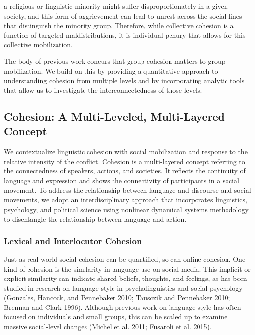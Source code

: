 \documentclass[
  english,
  man]{apa6}
\begin{document}
\begin{singlespace}
\setlength{\leftskip}{1cm}

\noindent a religious or linguistic minority
might suffer disproportionately in a given society, and this form of
aggrievement can lead to unrest across the social lines that distinguish the
minority group. Therefore, while collective cohesion is a function of targeted
maldistributions, it is individual penury that allows for this collective
mobilization.

\setlength{\leftskip}{0pt}
\end{singlespace}

The body of previous work concurs that group cohesion matters to group
mobilization. We build on this by providing a quantitative approach to
understanding cohesion from multiple levels and by incorporating analytic tools
that allow us to investigate the interconnectedness of those levels.

\hypertarget{cohesion-a-multi-leveled-multi-layered-concept}{%
\subsection{Cohesion: A Multi-Leveled, Multi-Layered Concept}\label{cohesion-a-multi-leveled-multi-layered-concept}}

We contextualize linguistic cohesion with social mobilization and response to
the relative intensity of the conflict. Cohesion is a multi-layered concept
referring to the connectedness of speakers, actions, and societies. It
reflects the continuity of language and expression and shows the
connectivity of participants in a social movement. To address the relationship
between language and discourse and social movements, we adopt an
interdisciplinary approach that incorporates linguistics, psychology, and
political science using nonlinear dynamical systems methodology to disentangle the
relationship between language and action.

\hypertarget{lexical-and-interlocutor-cohesion}{%
\subsubsection{Lexical and Interlocutor Cohesion}\label{lexical-and-interlocutor-cohesion}}

Just as real-world social cohesion can be quantified, so can online cohesion.
One kind of cohesion is the similarity in language use on social
media. This implicit or explicit similarity can indicate shared
beliefs, thoughts, and feelings, as has been studied in research on language
style in psycholinguistics and social psychology (Gonzales, Hancock, and Pennebaker 2010; Tausczik and Pennebaker 2010; Brennan and Clark 1996). Although previous work on language style has often
focused on individuals and small groups, this can be scaled up to examine
massive social-level changes (Michel et al. 2011; Fusaroli et al. 2015).
\end{document}
